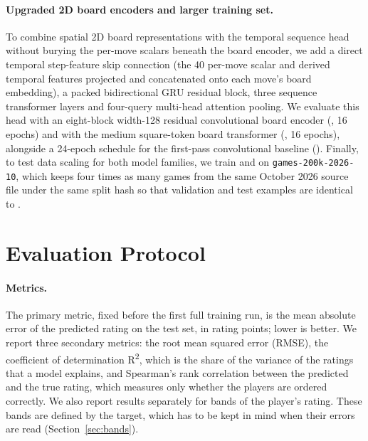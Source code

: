 \documentclass[11pt]{article}
\begin{document}
\paragraph{Upgraded 2D board encoders and larger training set.}
To combine spatial 2D board representations with the temporal sequence head
without burying the per-move scalars beneath the board encoder, we add a direct
temporal step-feature skip connection (the 40 per-move scalar and derived
temporal features projected and concatenated onto each move's board embedding),
a packed bidirectional GRU residual block, three sequence transformer layers
and four-query multi-head attention pooling. We evaluate this head with an
eight-block width-128 residual convolutional board encoder
(, 16 epochs) and with the medium square-token board
transformer (, 16 epochs), alongside a 24-epoch
schedule for the first-pass convolutional baseline ().
Finally, to test data scaling for both model families, we train
 and  on
\texttt{games-200k-2026-10}, which keeps four times as many games from the same
October 2026 source file under the same split hash so that validation and test
examples are identical to .

\section{Evaluation Protocol}
\label{sec:protocol}

\paragraph{Metrics.}
The primary metric, fixed before the first full training run, is the mean
absolute error of the predicted rating on the test set, in rating points;
lower is better. We report three secondary metrics: the root mean squared
error (RMSE), the coefficient of determination R\textsuperscript{2}, which is
the share of the variance of the ratings that a model explains, and
Spearman's rank correlation between the predicted and the true rating, which
measures only whether the players are ordered correctly. We also report
results separately for  bands of the player's rating. These
bands are defined by the target, which has to be kept in mind when their
errors are read (Section~\ref{sec:bands}).


\end{document}
